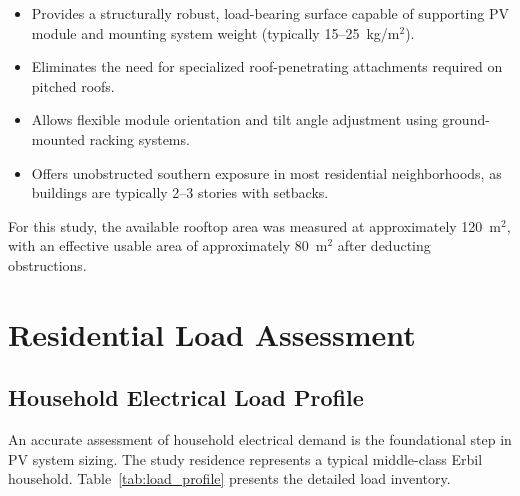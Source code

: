 \begin{itemize}
    \item Provides a structurally robust, load-bearing surface capable of supporting PV module and mounting system weight (typically 15--25~kg/m$^{2}$).
    \item Eliminates the need for specialized roof-penetrating attachments required on pitched roofs.
    \item Allows flexible module orientation and tilt angle adjustment using ground-mounted racking systems.
    \item Offers unobstructed southern exposure in most residential neighborhoods, as buildings are typically 2--3 stories with setbacks.
\end{itemize}

For this study, the available rooftop area was measured at approximately 120~m$^{2}$, with an effective usable area of approximately 80~m$^{2}$ after deducting obstructions.


\section{Residential Load Assessment}

\subsection{Household Electrical Load Profile}

An accurate assessment of household electrical demand is the foundational step in PV system sizing. The study residence represents a typical middle-class Erbil household. Table~\ref{tab:load_profile} presents the detailed load inventory.

